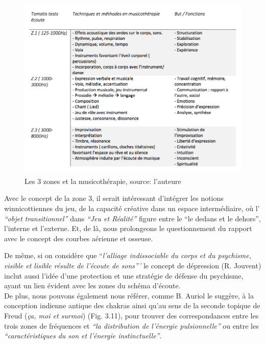 \begin{figure}[tbh]
	\centering
	\includegraphics[width=0.9\linewidth]{images/testtechnmethbut}
	\caption[Zones du test avec la musicothérapie]{Les 3
		zones et la musicothérapie, source: l'auteure}
	
	\label{testbutetfonction}
\end{figure}
\clearpage

Avec le concept de la zone 3, il serait intéressant d'intégrer les notions winnicottiennes du jeu, de la 
capacité
créative dans un espace
intermédiaire, où l' \textit{``objet
	transitionnel'' } dans \textit{``Jeu et Réalité''}
\autocite{winnicott}
figure entre le ``le
dedans et le
dehors'',
l'interne et l'externe.  Et, de là, nous prolongeons le questionnement du
rapport avec le concept des
courbes aérienne et osseuse.

De même, si on considère que ``\emph{l'alliage indissociable du corps et du psychisme,
	visible et lisible résulte de l'écoute de
	sons'''}\autocite{tomatis_conf1972}
le concept de dépression (R. Jouvent) \autocite{doronparot}  inclut aussi l'idée d'une protection et 
une stratégie de
défense du psychisme, ayant un lien évident avec les zones du schéma d'écoute.
\\
De plus, nous pouvons également nous référer, comme B. Auriol le suggère, à la conception indienne 
antique des chakras
ainsi qu'au sens de la seconde
topique de Freud (\textit{ça, moi et surmoi}) (Fig. 3.11), pour trouver des correspondances
entre les trois zones de
fréquences et \textit {``la distribution de l'énergie pulsionnelle''} ou entre
les
\textit{``caractéristiques du son et l'énergie
	instinctuelle''}\autocite[ch. 13]{auriol:cle}.


